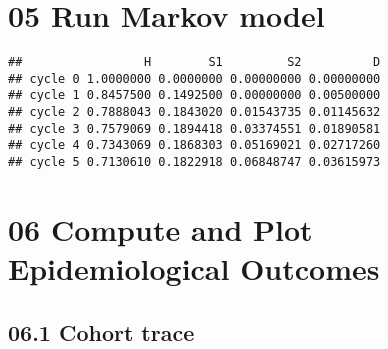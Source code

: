\documentclass[
]{article}
\newenvironment{Shaded}{\begin{snugshade}}{\end{snugshade}}
\newcommand{\CommentTok}[1]{\textcolor[rgb]{0.56,0.35,0.01}{\textit{#1}}}
\newcommand{\ControlFlowTok}[1]{\textcolor[rgb]{0.13,0.29,0.53}{\textbf{#1}}}
\newcommand{\DecValTok}[1]{\textcolor[rgb]{0.00,0.00,0.81}{#1}}
\newcommand{\KeywordTok}[1]{\textcolor[rgb]{0.13,0.29,0.53}{\textbf{#1}}}
\newcommand{\NormalTok}[1]{#1}
\newcommand{\OperatorTok}[1]{\textcolor[rgb]{0.81,0.36,0.00}{\textbf{#1}}}
\newcommand{\StringTok}[1]{\textcolor[rgb]{0.31,0.60,0.02}{#1}}
\begin{document}
\hypertarget{run-markov-model}{%
\section{05 Run Markov model}\label{run-markov-model}}

\begin{Shaded}
\end{Shaded}

\begin{verbatim}
##                 H        S1         S2          D
## cycle 0 1.0000000 0.0000000 0.00000000 0.00000000
## cycle 1 0.8457500 0.1492500 0.00000000 0.00500000
## cycle 2 0.7888043 0.1843020 0.01543735 0.01145632
## cycle 3 0.7579069 0.1894418 0.03374551 0.01890581
## cycle 4 0.7343069 0.1868303 0.05169021 0.02717260
## cycle 5 0.7130610 0.1822918 0.06848747 0.03615973
\end{verbatim}

\hypertarget{compute-and-plot-epidemiological-outcomes}{%
\section{06 Compute and Plot Epidemiological
Outcomes}\label{compute-and-plot-epidemiological-outcomes}}

\hypertarget{cohort-trace-1}{%
\subsection{06.1 Cohort trace}\label{cohort-trace-1}}
\end{document}
